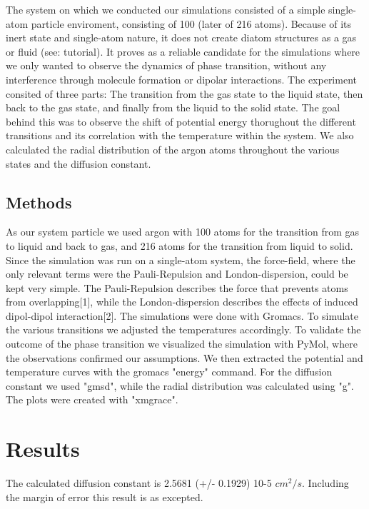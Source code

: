 \documentclass[10pt, a4paper, oneside, twocolumn]{report}
\begin{document}
The system on which we conducted our simulations consisted of a simple single-atom particle enviroment, consisting of 100 (later of 216 atoms). Because of its inert state and single-atom nature, it does not create diatom structures as a gas or fluid (see: tutorial). It proves as a reliable candidate for the simulations where we only wanted to observe the dynamics of phase transition, without any interference through molecule formation or dipolar interactions. The experiment consited of three parts:
The transition from the gas state to the liquid state, then back to the gas state, and finally from the liquid to the solid state. The goal behind this was to observe the shift of potential energy thorughout the different transitions and its correlation with the temperature within the system. We also calculated the radial distribution of the argon atoms throughout the various states and the diffusion constant.

\section{Methods}

As our system particle we used argon with 100 atoms for the transition from gas to liquid and back to gas, and 216 atoms for the transition from liquid to solid. Since the simulation was run on a single-atom system, the force-field, where the only relevant terms were the Pauli-Repulsion and London-dispersion, could be kept very simple. The Pauli-Repulsion describes the force that prevents atoms from overlapping[1], while the London-dispersion describes the effects of induced dipol-dipol interaction[2]. The simulations were done with Gromacs. To simulate the various transitions we adjusted the temperatures accordingly. To validate
the outcome of the phase transition we visualized the simulation with PyMol, where the observations confirmed our assumptions.
We then extracted the potential and temperature curves with the gromacs "energy" command. For the diffusion constant we used "gmsd", while the radial distribution was calculated using "g". The plots were created with "xmgrace".

\chapter{Results}

The calculated diffusion constant is 2.5681 (+/- 0.1929) 10-5 \(cm^2/s\). Including the margin of error this result is as excepted. 
\end{document}
